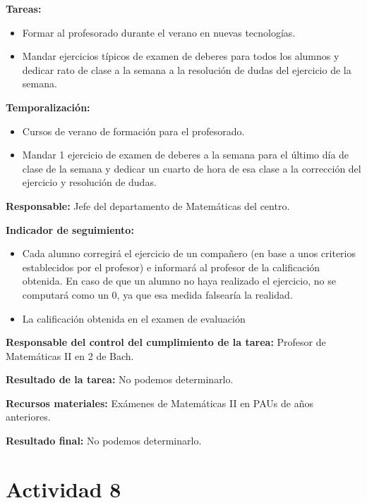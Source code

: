 \textbf{Tareas:}
\vspace{-0.3cm}
\begin{itemize}
	\item Formar al profesorado durante el verano en nuevas tecnologías.
	\item Mandar ejercicios típicos de examen de deberes para todos los alumnos y dedicar rato de clase a la semana a la resolución de dudas del ejercicio de la semana.
\end{itemize}


\textbf{Temporalización:}
\vspace{-0.3cm}
\begin{itemize}
	\item Cursos de verano de formación para el profesorado.
	\item Mandar 1 ejercicio de examen de deberes a la semana para el último día de clase de la semana y dedicar un cuarto de hora de esa clase a la corrección del ejercicio y resolución de dudas.
\end{itemize}

\textbf{Responsable:}
Jefe del departamento de Matemáticas del centro.

\textbf{Indicador de seguimiento:}
\vspace{-0.3cm}
\begin{itemize}
	\item Cada alumno corregirá el ejercicio de un compañero (en base a unos criterios establecidos por el profesor) e informará al profesor de la calificación obtenida.
	\subitem En caso de que un alumno no haya realizado el ejercicio, no se computará como un 0, ya que esa medida falsearía la realidad.
	\item La calificación obtenida en el examen de evaluación 
\end{itemize}

\textbf{Responsable del control del cumplimiento de la tarea:}
Profesor de Matemáticas II en 2 de Bach.

\textbf{Resultado de la tarea:}
No podemos determinarlo.

\textbf{Recursos materiales:}
Exámenes de Matemáticas II en PAUs de años anteriores.

\textbf{Resultado final:}
No podemos determinarlo.


\section{Actividad 8}

